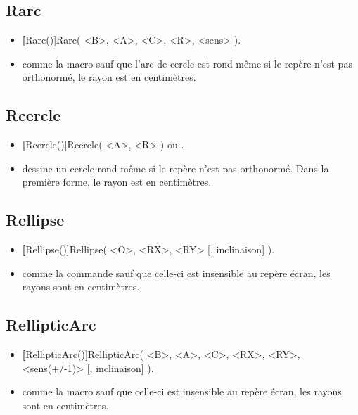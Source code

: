 \subsection{Rarc}

\begin{itemize}
 \item \util \textbf[Rarc()]{Rarc( <B>, <A>, <C>, <R>, <sens> )}.
 \item \desc comme la macro  sauf que l'arc de cercle est rond même si le repère n'est pas orthonormé, le rayon  est en centimètres.
\end{itemize}

\subsection{Rcercle}

\begin{itemize}
 \item \util \textbf[Rcercle()]{Rcercle( <A>, <R> )} ou .
 \item \desc dessine un cercle rond même si le repère n'est pas orthonormé. Dans la première forme, le rayon  est en centimètres.
\end{itemize}

\subsection{Rellipse}

\begin{itemize}
 \item \util \textbf[Rellipse()]{Rellipse( <O>, <RX>, <RY> [, inclinaison] )}.
 \item \desc comme la commande  sauf que celle-ci est insensible au repère écran, les rayons sont en centimètres.
\end{itemize}

\subsection{RellipticArc}

\begin{itemize}
 \item \util \textbf[RellipticArc()]{RellipticArc( <B>, <A>, <C>, <RX>, <RY>, <sens(+/-1)> [, inclinaison] )}.
 \item \desc comme la macro  sauf que celle-ci est insensible au repère écran, les rayons sont en centimètres.
\end{itemize}

